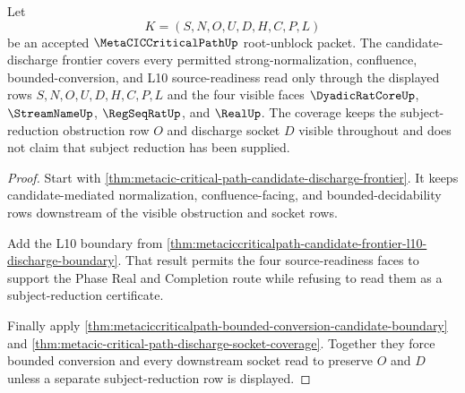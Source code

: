 \begin{theorem}
\label{thm:metaciccriticalpath-candidate-discharge-frontier-coverage}
Let
$$
K=(S,N,O,U,D,H,C,P,L)
$$
be an accepted $\MetaCICCriticalPathUp$ root-unblock packet. The candidate-discharge frontier covers every permitted strong-normalization, confluence, bounded-conversion, and L10 source-readiness read only through the displayed rows $S,N,O,U,D,H,C,P,L$ and the four visible faces $\DyadicRatCoreUp$, $\StreamNameUp$, $\RegSeqRatUp$, and $\RealUp$. The coverage keeps the subject-reduction obstruction row $O$ and discharge socket $D$ visible throughout and does not claim that subject reduction has been supplied.
\end{theorem}
\begin{proof}
Start with \autoref{thm:metacic-critical-path-candidate-discharge-frontier}. It keeps candidate-mediated normalization, confluence-facing, and bounded-decidability rows downstream of the visible obstruction and socket rows.

Add the L10 boundary from \autoref{thm:metaciccriticalpath-candidate-frontier-l10-discharge-boundary}. That result permits the four source-readiness faces to support the Phase Real and Completion route while refusing to read them as a subject-reduction certificate.

Finally apply \autoref{thm:metaciccriticalpath-bounded-conversion-candidate-boundary} and \autoref{thm:metacic-critical-path-discharge-socket-coverage}. Together they force bounded conversion and every downstream socket read to preserve $O$ and $D$ unless a separate subject-reduction row is displayed.
\end{proof}

